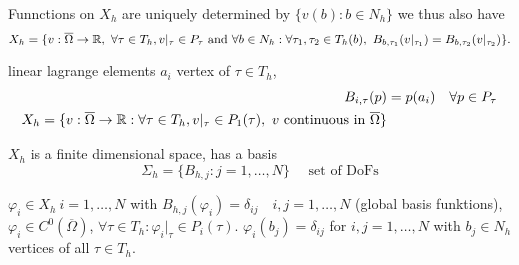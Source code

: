 Funnctions on $X_h$ are uniquely determined by $\{v(b): b \in N_h \}$ we thus also have 
\begin{equation*}
	X_h = \{ v: \overline{\Omega} \to \R,\ \forall \tau \in T_h, v|_\tau \in P_\tau \text{ and } \forall b \in N_h: \forall \tau_1,\tau_2 \in T_h(b) ,\ B_{b,\tau_1}(v|_{\tau_1}) = B_{b,\tau_2}(v|_{\tau_2})   \}.
\end{equation*}

\begin{example}
	linear lagrange elements $a_i$ vertex of $\tau \in T_h$,
	\begin{align*}
		B_{i,\tau}(p)  &= p(a_i) \quad \forall p \in P_\tau \\
		X_h = \{ v:\overline{\Omega} \to \mathbb{R} : \forall \tau \in T_h, v|_{\tau} \in P_1(\tau) ,\ v \text{ continuous in } \overline{\Omega} \}
	\end{align*}
\end{example}

$X_h$ is a finite dimensional space, has a basis
\begin{equation*}
	\Sigma_h = \{ B_{h,j} : j= 1,\dots,N  \} \quad \text{ set of DoFs} 
\end{equation*}

$\varphi_i \in X_h\ i=1,\dots,N$ with $B_{h,j}(\varphi_i) = \delta_{ij} \quad i,j=1,\dots,N$ (global basis funktions),$\varphi_i \in C^0(\overline{\Omega})$, $\forall \tau \in T_h: \varphi_i|_\tau \in P_i(\tau)$. $\varphi_i(b_j) = \delta_{ij}$ for $i,j = 1,\dots,N$ with $b_j \in N_h$ vertices of all $\tau \in T_h$.
